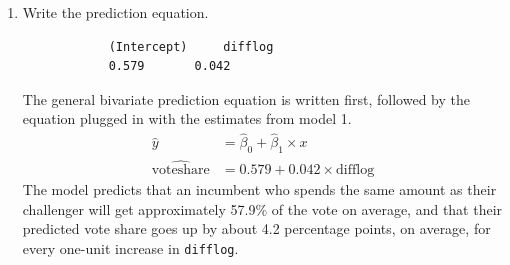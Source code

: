 \documentclass[12pt,letterpaper]{article}
\begin{document}
\begin{enumerate}
		\item Write the prediction equation.
		
		\begin{verbatim}
			(Intercept)     difflog 
			0.579       0.042 
		\end{verbatim}
		
		\noindent The general bivariate prediction equation is written first, followed by the equation plugged in with the estimates from model 1. 
		\begin{align*}
			\hat{y} &= \hat{\beta}_0 + \hat{\beta}_1 \times x \\
			\widehat{\text{voteshare}} &= 0.579 + 0.042 \times \text{difflog}
		\end{align*}
		\noindent The model predicts that an incumbent who spends the same amount as their challenger will get approximately 57.9\% of the vote on average, and that their predicted vote share goes up by about 4.2 percentage points, on average, for every one-unit increase in \texttt{difflog}.
	\end{enumerate}
\newpage
\end{document}
